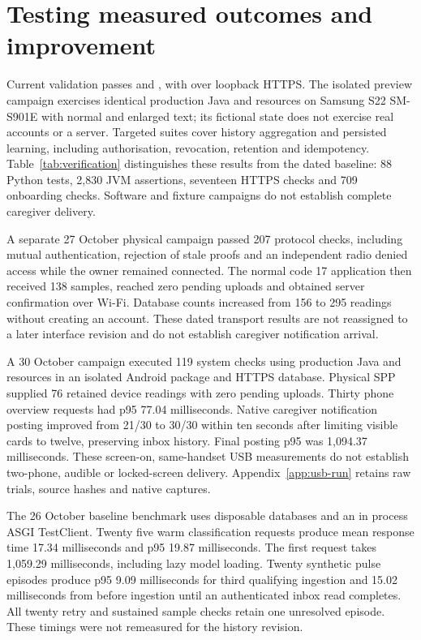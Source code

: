 \section{Testing measured outcomes and improvement}
\label{sec:testing}
\begin{reportprose}
Current validation passes \CurrentPythonResult{} and \CurrentJvmResult{}, with \CurrentIntegrationResult{} over loopback HTTPS. The isolated preview campaign exercises identical production Java and resources on Samsung S22 SM-S901E with normal and enlarged text; its fictional state does not exercise real accounts or a server. Targeted suites cover history aggregation and persisted learning, including authorisation, revocation, retention and idempotency. Table~\ref{tab:verification} distinguishes these results from the dated baseline: 88 Python tests, 2,830 JVM assertions, seventeen HTTPS checks and 709 onboarding checks. Software and fixture campaigns do not establish complete caregiver delivery.\cite{validation,integration,currentrevision}

A separate 27 October physical campaign passed 207 protocol checks, including mutual authentication, rejection of stale proofs and an independent radio denied access while the owner remained connected. The normal code 17 application then received 138 samples, reached zero pending uploads and obtained server confirmation over Wi-Fi. Database counts increased from 156 to 295 readings without creating an account. These dated transport results are not reassigned to a later interface revision and do not establish caregiver notification arrival.\cite{bluetoothphysical}

A 30 October campaign executed 119 system checks using production Java and resources in an isolated Android package and HTTPS database. Physical SPP supplied 76 retained device readings with zero pending uploads. Thirty phone overview requests had p95 77.04 milliseconds. Native caregiver notification posting improved from 21/30 to 30/30 within ten seconds after limiting visible cards to twelve, preserving inbox history. Final posting p95 was 1,094.37 milliseconds. These screen-on, same-handset USB measurements do not establish two-phone, audible or locked-screen delivery. Appendix~\ref{app:usb-run} retains raw trials, source hashes and native captures.\cite{systemrun}

The 26 October baseline benchmark uses disposable databases and an in process ASGI TestClient. Twenty five warm classification requests produce mean response time 17.34 milliseconds and p95 19.87 milliseconds. The first request takes 1,059.29 milliseconds, including lazy model loading. Twenty synthetic pulse episodes produce p95 9.09 milliseconds for third qualifying ingestion and 15.02 milliseconds from before ingestion until an authenticated inbox read completes. All twenty retry and sustained sample checks retain one unresolved episode. These timings were not remeasured for the history revision.\cite{benchmark}


\end{reportprose}
